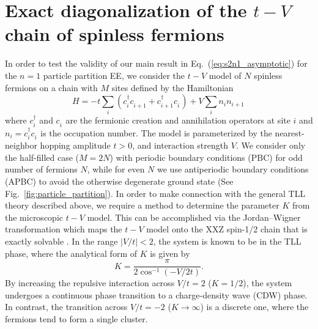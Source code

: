 \section{Exact diagonalization of the $t-V$ chain of spinless fermions}
In order to test the validity of our main result in
Eq.~(\ref{eq:s2n1_asymptotic}) for the $n=1$ particle partition EE, we consider
the $t-V$ model of $N$ spinless fermions on a chain with $M$ sites defined by
the Hamiltonian
%
\begin{equation}
  H= -t\sum_{i}\left(c^\dagger_{i} c^{\phantom{\dagger}}_{i+1} +c^\dagger_{i+1} c^{\phantom{\dagger}}_{i} \right) +V\sum_i n_i n_{i+1}\,
  \label{eq:H-tV}
\end{equation}
%
where $c^\dagger_{i}$ and $c^{\phantom{\dagger}}_{i}$ are the fermionic
creation and annihilation operators at site $i$ and
$n_i=c^\dagger_{i}c^{\phantom{\dagger}}_{i}$ is the occupation number.
The model is parameterized by the nearest-neighbor hopping amplitude $t>0$, and
interaction strength $V$. We consider only the half-filled case ($M=2N$) with
periodic boundary conditions (PBC) for odd number of fermions $N$, while for
even $N$ we use antiperiodic boundary conditions (APBC) 
to avoid the otherwise degenerate ground state
\cite{Cazalilla:2004} (See Fig.~\ref{fig:particle_partition}). In order to make
connection with the general TLL theory described above, we require a method to
determine the parameter $K$ from the microscopic $t-V$ model.  This can be
accomplished via the Jordan--Wigner transformation
\cite{Jordan:1928} which maps the $t-V$ model onto the XXZ spin-1/2
chain that is exactly solvable \cite{DesCloizeaux:1966,DesCloizeauxGaudin:1966}. In the range
$|V/t|<2$, the system is known to be in the TLL phase, where the analytical form of $K$
is given by
%
\begin{equation}
    K=\frac{\pi}{2\cos^{-1}(-V/2t)}.
\label{eq:K_tV}
\end{equation}
%
By increasing the repulsive interaction across $V/t=2$ ($K=1/2$), the system
undergoes a continuous phase transition to a charge-density wave (CDW) phase.
In contrast, the transition across $V/t=-2$ ($K\rightarrow \infty$) is a
discrete one, where the fermions tend to form a single cluster.

